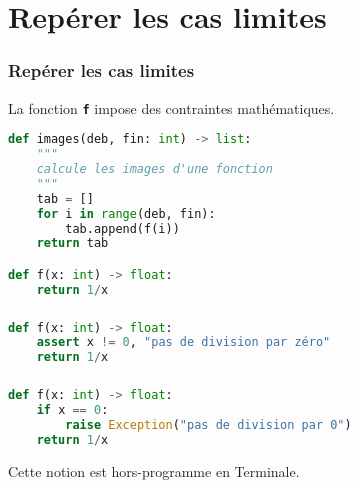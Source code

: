 \documentclass[svgnames,11pt]{beamer}
\begin{document}
\section{Repérer les cas limites}
\begin{frame}[fragile]
    \frametitle{Repérer les cas limites}
    \begin{aretenir}[Observation]
        La fonction \textbf{\texttt{f}} impose des contraintes mathématiques.
    \end{aretenir}

    \begin{center}
        \begin{lstlisting}[language=Python , basicstyle=\ttfamily\small, xleftmargin=2em, xrightmargin=2em]
def images(deb, fin: int) -> list:
    """
    calcule les images d'une fonction
    """
    tab = []
    for i in range(deb, fin):
        tab.append(f(i))
    return tab

def f(x: int) -> float:
    return 1/x
\end{lstlisting}
    \end{center}

\end{frame}
\begin{frame}[fragile]
    \frametitle{}

    \begin{center}
        \begin{lstlisting}[language=Python , basicstyle=\ttfamily\small, xleftmargin=2em, xrightmargin=2em]
def f(x: int) -> float:
    assert x != 0, "pas de division par zéro"
    return 1/x
\end{lstlisting}
    \end{center}

\end{frame}
\begin{frame}[fragile]
    \frametitle{}

    \begin{center}
        \begin{lstlisting}[language=Python , basicstyle=\ttfamily\small, xleftmargin=1em, xrightmargin=0em]
def f(x: int) -> float:
    if x == 0:
        raise Exception("pas de division par 0")
    return 1/x
\end{lstlisting}
    \end{center}
    \begin{aretenir}[]
        Cette notion est hors-programme en Terminale.
    \end{aretenir}
\end{frame}
\end{document}

